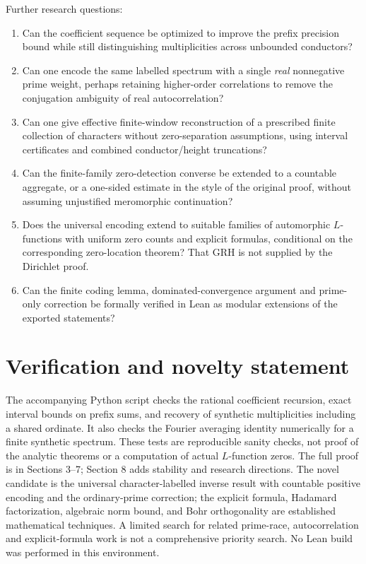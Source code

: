 \documentclass[11pt]{article}
\theoremstyle{remark}\newtheorem{remark}[theorem]{Remark}
\begin{document}
Further research questions:
\begin{enumerate}[leftmargin=*]
\item Can the coefficient sequence be optimized to improve the prefix precision bound while still distinguishing multiplicities across unbounded conductors?
\item Can one encode the same labelled spectrum with a single \emph{real} nonnegative prime weight, perhaps retaining higher-order correlations to remove the conjugation ambiguity of real autocorrelation?
\item Can one give effective finite-window reconstruction of a prescribed finite collection of characters without zero-separation assumptions, using interval certificates and combined conductor/height truncations?
\item Can the finite-family zero-detection converse be extended to a countable aggregate, or a one-sided estimate in the style of the original proof, without assuming unjustified meromorphic continuation?
\item Does the universal encoding extend to suitable families of automorphic $L$-functions with uniform zero counts and explicit formulas, conditional on the corresponding zero-location theorem? That GRH is not supplied by the Dirichlet proof.
\item Can the finite coding lemma, dominated-convergence argument and prime-only correction be formally verified in Lean as modular extensions of the exported statements?
\end{enumerate}

\section*{Verification and novelty statement}
The accompanying Python script checks the rational coefficient recursion, exact interval bounds on prefix sums, and recovery of synthetic multiplicities including a shared ordinate. It also checks the Fourier averaging identity numerically for a finite synthetic spectrum. These tests are reproducible sanity checks, not proof of the analytic theorems or a computation of actual $L$-function zeros. The full proof is in Sections 3--7; Section 8 adds stability and research directions. The novel candidate is the universal character-labelled inverse result with countable positive encoding and the ordinary-prime correction; the explicit formula, Hadamard factorization, algebraic norm bound, and Bohr orthogonality are established mathematical techniques. A limited search for related prime-race, autocorrelation and explicit-formula work is not a comprehensive priority search. No Lean build was performed in this environment.
\end{document}
